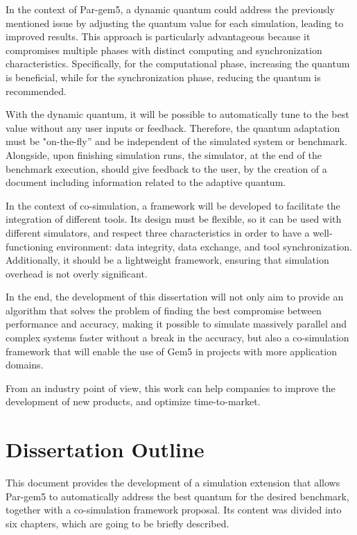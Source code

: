 In the context of Par-gem5, a dynamic quantum could address the previously mentioned issue by adjusting the quantum value for each simulation, 
leading to improved results. 
This approach is particularly advantageous because it compromises multiple phases with distinct computing and synchronization 
characteristics. Specifically, for the computational phase, increasing the quantum is beneficial, while for the synchronization phase, 
reducing the quantum is recommended.

With the dynamic quantum, it will be possible to automatically tune to the best value without any user inputs or feedback. 
Therefore, the quantum adaptation must be "on-the-fly” and be independent of the simulated system or benchmark. 
Alongside, upon finishing simulation runs, the simulator, at the end of the benchmark execution, should give feedback to the user, 
by the creation of a document including information related to the adaptive quantum.

In the context of co-simulation, a framework will be developed to facilitate the integration of different tools. Its design 
must be flexible, so it can be used with different simulators, and respect three characteristics in order to have a well-functioning
environment: data integrity, data exchange, and tool synchronization. Additionally, it should be a lightweight framework, 
ensuring that simulation overhead is not overly significant.

In the end, the development of this dissertation will not only aim to provide an algorithm that solves the problem of 
finding the best compromise between performance and accuracy, making it possible to simulate 
massively parallel and complex systems faster without a break in the accuracy, but also a co-simulation framework that will enable the use 
of Gem5 in projects with more application domains.

From an industry point of view, this work can help companies to improve the development of new products, and optimize time-to-market.
 
\section{Dissertation Outline}

This document provides the development of a simulation extension that allows Par-gem5 to automatically address the best quantum for the desired 
benchmark, together with a co-simulation framework proposal. Its content was divided into six chapters, which are going to be briefly described.

